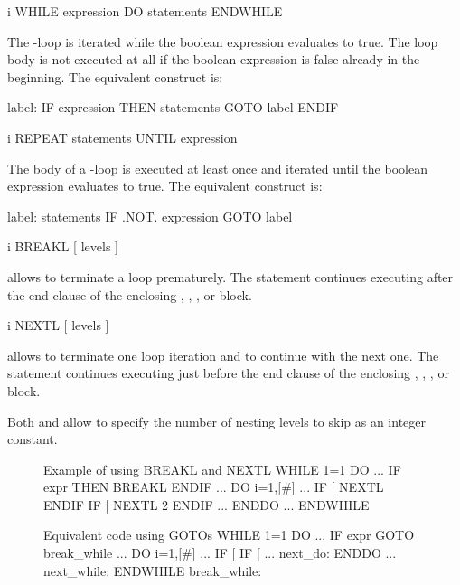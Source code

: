 \condbreak{3cm} 
\begin{Gray}{i}
WHILE expression DO
   statements
ENDWHILE
\end{Gray}
\label{ref:WHILE}
The -loop is iterated while the boolean expression
evaluates to true.
The loop body is not executed at all if the boolean expression is
false already in the beginning.
The equivalent construct is:
\begin{XMP}
label:
IF expression THEN
   statements
   GOTO label
ENDIF
\end{XMP}

 
\label{ref:REPEAT}
 
\begin{Gray}{i}
REPEAT
   statements
UNTIL expression
\end{Gray}
The body of a -loop is executed at least once and iterated
until the boolean expression evaluates to true.
The equivalent construct is:
\begin{XMP}
label:
   statements
IF .NOT. expression GOTO label
\end{XMP}

 
\label{ref:BREAKL}

\begin{Gray}{i}
BREAKL  [ levels ]
\end{Gray}
allows to terminate a loop prematurely.
The  statement continues executing after the end clause of the
enclosing , , , or  block.

\begin{Gray}{i}
NEXTL  [ levels ]
\end{Gray}
allows to terminate one loop iteration and to continue with the next one.
The  statement continues executing just before the end
clause of the enclosing , , , or
 block. 

Both  and  allow to specify the number of
nesting levels to skip as an integer constant.

\begin{figure}[htb]\centering
\begin{XMPin}{Example of using BREAKL and NEXTL}
WHILE 1=1 DO
   ...
   IF expr THEN
      BREAKL
   ENDIF
   ...
   DO i=1,[#]
      ...
      IF [%
         NEXTL
      ENDIF
      IF [%
         NEXTL 2
      ENDIF
      ...
   ENDDO
   ...
ENDWHILE
\end{XMPin}
\begin{XMPout}{Equivalent code using GOTOs}
WHILE 1=1 DO
   ...
   IF expr GOTO break_while
   ...
   DO i=1,[#]
      ...
      IF [%
      IF [%
     ...
   next_do:
   ENDDO
   ...
next_while:
ENDWHILE
break_while:
\end{XMPout}
\end{figure}


